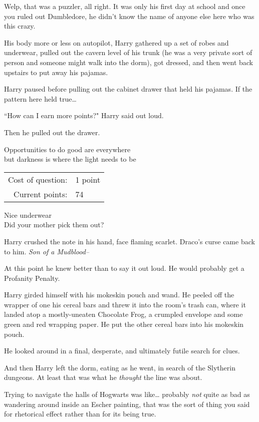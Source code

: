 Welp, that was a puzzler, all right. It was only his first day at school and once you ruled out Dumbledore, he didn't know the name of anyone else here who was this crazy.

His body more or less on autopilot, Harry gathered up a set of robes and underwear, pulled out the cavern level of his trunk (he was a very private sort of person and someone might walk into the dorm), got dressed, and then went back upstairs to put away his pajamas.

Harry paused before pulling out the cabinet drawer that held his pajamas. If the pattern here held true{\ldots}

``How can I earn more points?" Harry said out loud.

Then he pulled out the drawer.
\begin{writtenNote}
Opportunities to do good are everywhere\\
but darkness is where the light needs to be

\begin{tabular}{rl}
Cost of question: & 1 point\\
Current points: & 74
\end{tabular}

Nice underwear\\
Did your mother pick them out?
\end{writtenNote}

Harry crushed the note in his hand, face flaming scarlet. Draco's curse came back to him. \emph{Son of a Mudblood\---}

At this point he knew better than to say it out loud. He would probably get a Profanity Penalty.

Harry girded himself with his mokeskin pouch and wand. He peeled off the wrapper of one his cereal bars and threw it into the room's trash can, where it landed atop a mostly-uneaten Chocolate Frog, a crumpled envelope and some green and red wrapping paper. He put the other cereal bars into his mokeskin pouch.

He looked around in a final, desperate, and ultimately futile search for clues.

And then Harry left the dorm, eating as he went, in search of the Slytherin dungeons. At least that was what he \emph{thought} the line was about.

Trying to navigate the halls of Hogwarts was like{\ldots} probably \emph{not} quite as bad as wandering around inside an Escher painting, that was the sort of thing you said for rhetorical effect rather than for its being true.

